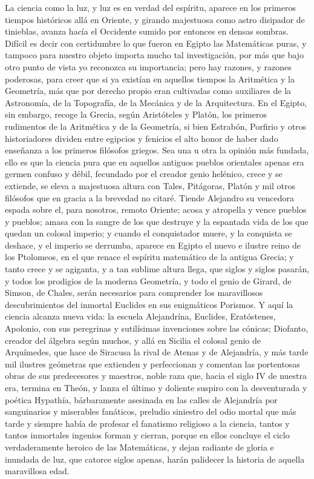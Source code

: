 \documentclass[a4paper, 12pt]{article}
\begin{document}
La ciencia como la luz, y luz es en verdad del espíritu, aparece en los primeros tiempos históricos allá en Oriente, y girando majestuosa como astro disipador de tinieblas, avanza hacía el Occidente sumido por entonces en densas sombras.  Difícil es decir con certidumbre lo que fueron en Egipto las Matemáticas puras, y tampoco para nuestro objeto importa mucho tal investigación, por más que bajo otro punto de vista yo reconozca su importancia; pero hay razones, y razones poderosas, para creer que si ya existían en aquellos tiempos la Aritmética y la Geometría, más que por derecho propio eran cultivadas como auxiliares de la Astronomía, de la Topografía, de la Mecánica y de la Arquitectura.  En el Egipto, sin embargo, recoge la Grecia, según Aristóteles y Platón, los primeros rudimentos de la Aritmética y de la Geometría, si bien Estrabón, Porfirio y otros historiadores dividen entre egipcios y fenicios el alto honor de haber dado enseñanza a los primeros filósofos griegos.  Sea una u otra la opinión más fundada, ello es que la ciencia pura que en aquellos antiguos pueblos orientales apenas era germen confuso y débil, fecundado por el creador genio helénico, crece y se extiende, se eleva a majestuosa altura con Tales, Pitágoras, Platón y mil otros filósofos que en gracia a la brevedad no citaré.  Tiende Alejandro su vencedora espada sobre el, para nosotros, remoto Oriente; acosa y atropella y vence pueblos y pueblos; amasa con la sangre de los que destruye y la espantada vida de los que quedan un colosal imperio; y cuando el conquistador muere, y la conquista se deshace, y el imperio se derrumba, aparece en Egipto el nuevo e ilustre reino de los Ptolomeos, en el que renace el espíritu matemático de la antigua Grecia; y tanto crece y se agiganta, y a tan sublime altura llega, que siglos y siglos pasarán, y todos los prodigios de la moderna Geometría, y todo el genio de Girard, de Simson, de Chales, serán necesarios para comprender los maravillosos descubrimientos del inmortal Euclides en sus enigmáticos Porismos.  Y aquí la ciencia alcanza nueva vida: la escuela Alejandrína, Euclides, Eratóstenes, Apolonio, con sus peregrinas y sutilísimas invenciones sobre las cónicas; Diofanto, creador del álgebra según muchos, y allá en Sicilia el colosal genio de Arquímedes, que hace de Siracusa la rival de Atenas y de Alejandría, y más tarde mil ilustres geómetras que extienden y perfeccionan y comentan las portentosas obras de sus predecesores y maestros, noble raza que, hacia el siglo IV de nuestra era, termina en Theón, y lanza el último y doliente suspiro con la desventurada y poética Hypathía, bárbaramente asesinada en las calles de Alejandría por sanguinarios y miserables fanáticos, preludio siniestro del odio mortal que más tarde y siempre había de profesar el fanatismo religioso a la ciencia, tantos y tantos inmortales ingenios forman y cierran, porque en ellos concluye el ciclo verdaderamente heroico de las Matemáticas, y dejan radiante de gloria e inundada de luz, que catorce siglos apenas, harán palidecer la historia de aquella maravillosa edad.
\end{document}
